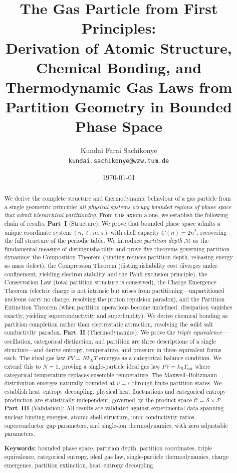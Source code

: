 \documentclass[twocolumn,10pt,a4paper]{article}
\title{\textbf{The Gas Particle from First Principles:\\Derivation of Atomic Structure, Chemical Bonding, and Thermodynamic Gas Laws from Partition Geometry in Bounded Phase Space}}
\author{
Kundai Farai Sachikonye\\
\texttt{kundai.sachikonye@wzw.tum.de}
}
\date{\today}
\theoremstyle{plain}
\theoremstyle{definition}
\theoremstyle{remark}
\newcommand{\kB}{k_{\mathrm{B}}}
\newcommand{\Depth}{\mathcal{M}}
\newcommand{\Partition}{\mathcal{P}}
\newcommand{\Cat}{\mathcal{C}}
\newcommand{\Sspace}{\mathcal{S}}
\begin{document}
\maketitle

\begin{abstract}
\noindent We derive the complete structure and thermodynamic behaviour of a gas particle from a single geometric principle: \emph{all physical systems occupy bounded regions of phase space that admit hierarchical partitioning}. From this axiom alone, we establish the following chain of results. \textbf{Part~I} (Structure): We prove that bounded phase space admits a unique coordinate system $(n, \ell, m, s)$ with shell capacity $C(n) = 2n^2$, recovering the full structure of the periodic table. We introduce \emph{partition depth} $\Depth$ as the fundamental measure of distinguishability and prove five theorems governing partition dynamics: the Composition Theorem (binding reduces partition depth, releasing energy as mass defect), the Compression Theorem (distinguishability cost diverges under confinement, yielding electron stability and the Pauli exclusion principle), the Conservation Law (total partition structure is conserved), the Charge Emergence Theorem (electric charge is not intrinsic but arises from partitioning---unpartitioned nucleons carry no charge, resolving the proton repulsion paradox), and the Partition Extinction Theorem (when partition operations become undefined, dissipation vanishes exactly, yielding superconductivity and superfluidity). We derive chemical bonding as partition completion rather than electrostatic attraction, resolving the solid salt conductivity paradox. \textbf{Part~II} (Thermodynamics): We prove the \emph{triple equivalence}---oscillation, categorical distinction, and partition are three descriptions of a single structure---and derive entropy, temperature, and pressure in three equivalent forms each. The ideal gas law $PV = Nk_BT$ emerges as a categorical balance condition. We extend this to $N = 1$, proving a single-particle ideal gas law $PV = \kB T_{\mathrm{cat}}$ where categorical temperature replaces ensemble temperature. The Maxwell--Boltzmann distribution emerges naturally bounded at $v = c$ through finite partition states. We establish heat--entropy decoupling: physical heat fluctuations and categorical entropy production are statistically independent, governed by the product space $\Cat = \Sspace \times \Partition$. \textbf{Part~III} (Validation): All results are validated against experimental data spanning nuclear binding energies, atomic shell structure, ionic conductivity ratios, superconductor gap parameters, and single-ion thermodynamics, with zero adjustable parameters.

\medskip
\noindent\textbf{Keywords:} bounded phase space, partition depth, partition coordinates, triple equivalence, categorical entropy, ideal gas law, single-particle thermodynamics, charge emergence, partition extinction, heat--entropy decoupling
\end{abstract}
\end{document}
